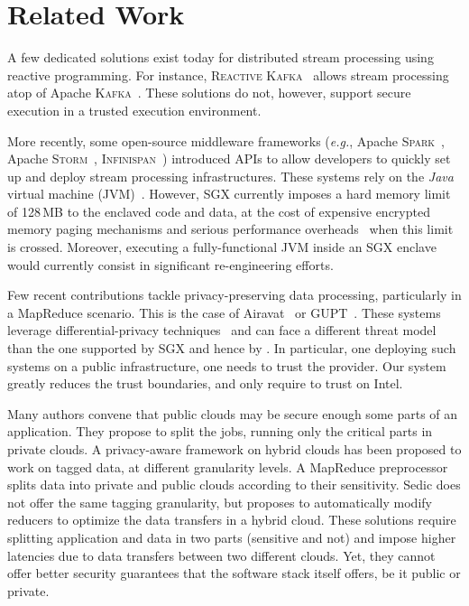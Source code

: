 \section{Related Work}\label{sec:rw}


A few dedicated solutions exist today for distributed stream processing using reactive programming.
For instance, \textsc{Reactive Kafka}~\cite{reactivekafka} allows stream processing atop of Apache \textsc{Kafka}~\cite{apachekafka}.
These solutions do not, however, support secure execution in a trusted execution environment.

More recently, some open-source middleware frameworks (\emph{e.g.}, Apache \textsc{Spark}~\cite{apachesparkstreaming}, Apache \textsc{Storm}~\cite{apachestorm}, \textsc{Infinispan}~\cite{infinispan}) introduced APIs to allow developers to quickly set up and deploy stream processing infrastructures.
These systems rely on the \emph{Java} virtual machine (JVM)~\cite{lindholm2014java}.
However, SGX currently imposes a hard memory limit of 128\,MB to the enclaved code and data, at the cost of expensive encrypted memory paging mechanisms and serious performance overheads~\cite{pires_scbr:2016,brenner_securekeeper:_2016} when this limit is crossed.
Moreover, executing a fully-functional JVM inside an SGX enclave would currently consist in significant re-engineering efforts.

Few recent contributions tackle privacy-preserving data processing, particularly in a MapReduce scenario.
This is the case of Airavat~\cite{Roy:2010:ASP:1855711.1855731} or GUPT~\cite{Mohan:2012:GPP:2213836.2213876}.
These systems leverage differential-privacy techniques~\cite{dwork2006calibrating} and can face a different threat model than the one supported by SGX and hence by \SYS.
In particular, one deploying such systems on a public infrastructure, one needs to trust the provider. 
Our system greatly reduces the trust boundaries, and only require to trust on Intel.

Many authors convene that public clouds may be secure enough some parts of an application. They propose to split the jobs, running only the critical parts in private clouds.
A privacy-aware framework on hybrid clouds \cite{xu2015framework} has been proposed to work on tagged data, at different granularity levels.
A MapReduce preprocessor splits data into private and public clouds according to their sensitivity.
Sedic \cite{zhang2011sedic} does not offer the same tagging granularity, but proposes to automatically modify reducers to optimize the data transfers in a hybrid cloud.
These solutions require splitting application and data in two parts (sensitive and not) and impose higher latencies due to data transfers between two different clouds.
Yet, they cannot offer better security guarantees that the software stack itself offers, be it public or private.

